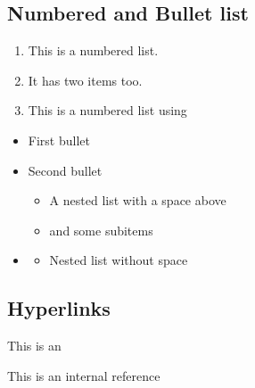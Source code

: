 \documentclass[letterpaper,10pt,english]{sphinxmanual}
\begin{document}
\subsection{Numbered and Bullet list}
\label{\detokenize{usage:numbered-and-bullet-list}}\begin{enumerate}
%
\item {} 
\sphinxAtStartPar
This is a numbered list.

\item {} 
\sphinxAtStartPar
It has two items too.

\item {} 
\sphinxAtStartPar
This is a numbered list using \sphinxcode{\sphinxupquote{\#}}

\end{enumerate}
\begin{itemize}
\item {} 
\sphinxAtStartPar
First bullet

\item {} 
\sphinxAtStartPar
Second bullet
\begin{itemize}
\item {} 
\sphinxAtStartPar
A nested list with a space above

\item {} 
\sphinxAtStartPar
and some subitems

\end{itemize}

\item {} \begin{description}
\begin{itemize}
\item {} 
\sphinxAtStartPar
Nested list without space

\end{itemize}

\end{description}

\end{itemize}


\subsection{Hyperlinks}
\label{\detokenize{usage:hyperlinks}}
\sphinxAtStartPar
This is an 

\sphinxAtStartPar
This is an internal reference {\hyperref[\detokenize{usage:inline-formatting}]{}}
\end{document}
